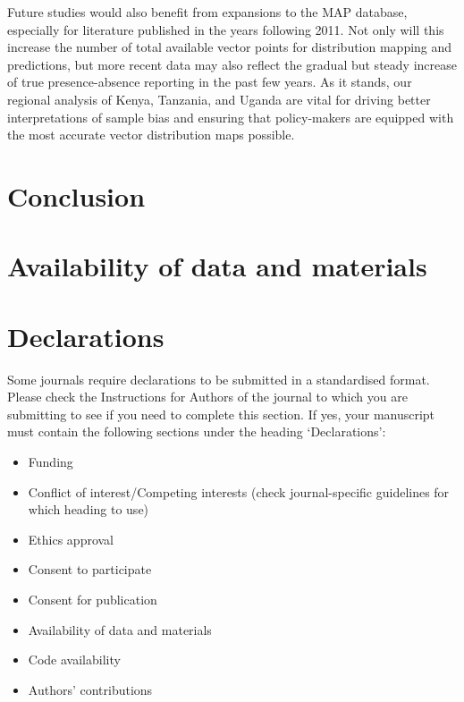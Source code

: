 \documentclass[sn-nature]{sn-jnl}%
\begin{document}
{Future studies would also benefit from expansions to the MAP database, especially for literature published in the years following 2011. Not only will this increase the number of total available vector points for distribution mapping and predictions, but more recent data may also reflect the gradual but steady increase of true presence-absence reporting in the past few years. As it stands, our regional analysis of Kenya, Tanzania, and Uganda are vital for driving better interpretations of sample bias and ensuring that policy-makers are equipped with the most accurate vector distribution maps possible.



\section{Conclusion}\label{conclusion}

\section{Availability of data and materials}\label{availability of data and materials}

\backmatter






\section*{Declarations}

Some journals require declarations to be submitted in a standardised format. Please check the Instructions for Authors of the journal to which you are submitting to see if you need to complete this section. If yes, your manuscript must contain the following sections under the heading `Declarations':

\begin{itemize}
\item Funding
\item Conflict of interest/Competing interests (check journal-specific guidelines for which heading to use)
\item Ethics approval 
\item Consent to participate
\item Consent for publication
\item Availability of data and materials
\item Code availability 
\item Authors' contributions
\end{itemize}

}
\end{document}
